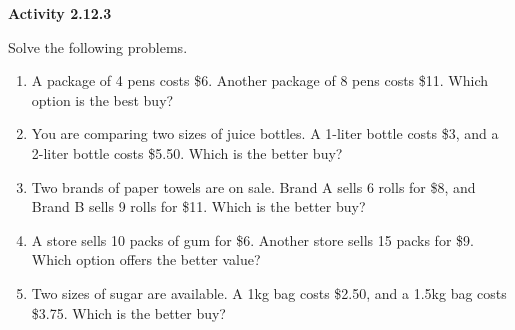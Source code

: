  \vspace{1ex}
\noindent\textbf{Activity 2.12.3}

\vspace{0.75ex}

Solve the following problems. 

\begin{enumerate}[noitemsep, label = \color{blue}\arabic*. ]

    \item A package of 4 pens costs \$6. Another package of 8 pens costs \$11. Which option is the best buy?
    \item You are comparing two sizes of juice bottles. A 1-liter bottle costs \$3, and a 2-liter bottle costs \$5.50. Which is the better buy?
    \item Two brands of paper towels are on sale. Brand A sells 6 rolls for \$8, and Brand B sells 9 rolls for \$11. Which is the better buy?
    \item A store sells 10 packs of gum for \$6. Another store sells 15 packs for \$9. Which option offers the better value?
    \item Two sizes of sugar are available. A 1kg bag costs \$2.50, and a 1.5kg bag costs \$3.75. Which is the better buy?
\end{enumerate}


